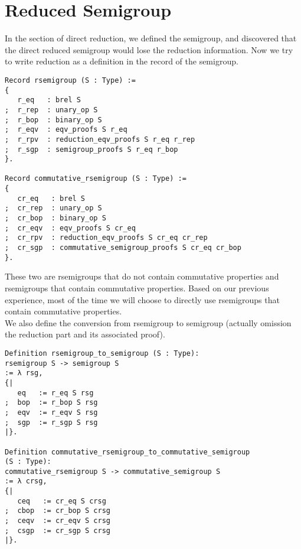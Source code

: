 \documentclass[a4paper,12pt,twoside,openright]{report}
\begin{document}
\section{Reduced Semigroup}
In the section of direct reduction, we defined the semigroup, and discovered that the direct reduced semigroup would lose the reduction information.
Now we try to write reduction as a definition in the record of the semigroup.
\begin{lstlisting}
Record rsemigroup (S : Type) :=
{
   r_eq   : brel S
;  r_rep  : unary_op S                      
;  r_bop  : binary_op S
;  r_eqv  : eqv_proofs S r_eq
;  r_rpv  : reduction_eqv_proofs S r_eq r_rep                        
;  r_sgp  : semigroup_proofs S r_eq r_bop
}.

Record commutative_rsemigroup (S : Type) :=
{
   cr_eq   : brel S
;  cr_rep  : unary_op S                      
;  cr_bop  : binary_op S
;  cr_eqv  : eqv_proofs S cr_eq
;  cr_rpv  : reduction_eqv_proofs S cr_eq cr_rep                        
;  cr_sgp  : commutative_semigroup_proofs S cr_eq cr_bop
}.
\end{lstlisting}
These two are rsemigroups that do not contain commutative properties and rsemigroups that contain commutative properties.
Based on our previous experience, most of the time we will choose to directly use rsemigroups that contain commutative properties.\\
We also define the conversion from rsemigroup to semigroup (actually omission the reduction part and its associated proof).
\begin{lstlisting}
Definition rsemigroup_to_semigroup (S : Type): 
rsemigroup S -> semigroup S
:= λ rsg,
{|    
   eq   := r_eq S rsg 
;  bop  := r_bop S rsg 
;  eqv  := r_eqv S rsg 
;  sgp  := r_sgp S rsg
|}.

Definition commutative_rsemigroup_to_commutative_semigroup 
(S : Type): 
commutative_rsemigroup S -> commutative_semigroup S
:= λ crsg,
{|    
   ceq   := cr_eq S crsg 
;  cbop  := cr_bop S crsg 
;  ceqv  := cr_eqv S crsg 
;  csgp  := cr_sgp S crsg
|}.
\end{lstlisting}
\end{document}
